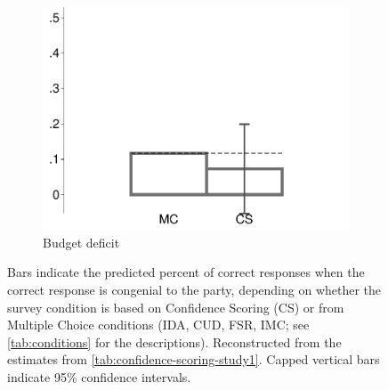 \begin{figure}[t]
\begin{subfigure}{.325\textwidth}
		\includegraphics[width=\textwidth]{../figs/confidence_score_deficit_study1.pdf}
		\caption{Budget deficit}
	\end{subfigure}	
	\caption*{\footnotesize 
		Bars indicate the predicted percent of correct responses when the correct response is congenial to the party, depending on whether the survey condition is based on Confidence Scoring (CS) or from Multiple Choice conditions (IDA, CUD, FSR, IMC; see \cref{tab:conditions} for the descriptions).
		Reconstructed from the estimates from \cref{tab:confidence-scoring-study1}.
		Capped vertical bars indicate 95\% confidence intervals.
	}
	\label{fig:confidence-scoring-study1}
\end{figure}


